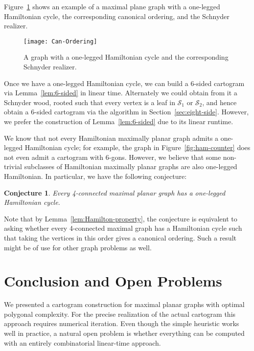 \documentclass[11pt]{article}
\newtheorem{conjecture}{Conjecture}[section]
\begin{document}
Figure~\ref{fig:Can-Ordering} shows an example of a maximal plane
graph with a one-legged Hamiltonian cycle, the corresponding canonical
ordering, and the Schnyder realizer.

\begin{figure}[htbp]
\centering
 \texttt{[image: Can-Ordering]}
 \caption{\small\sf A
  graph with a one-legged Hamiltonian cycle and
 the corresponding Schnyder realizer.}
 \label{fig:Can-Ordering}
\end{figure}


Once we have a one-legged Hamiltonian cycle, we can build a
6-sided cartogram via Lemma~\ref{lem:6-sided} in linear
time. Alternately we could obtain from it a Schnyder wood, rooted such
that every vertex is a leaf in $\mathcal{S}_1$ or $\mathcal{S}_2$, and
hence obtain a 6-sided cartogram via the algorithm in
Section~\ref{sec:eight-side}. However, we prefer the construction of Lemma~\ref{lem:6-sided} due to
its linear runtime.

We know that not every Hamiltonian maximally planar graph admits a
one-legged Hamiltonian cycle; for example, the graph in
Figure~\ref{fig:ham-counter} does not even admit a cartogram with
6-gons. However, we believe that some non-trivial subclasses of
Hamiltonian maximally planar graphs are also one-legged Hamiltonian. In particular, we have the following conjecture:

\begin{conjecture}
Every 4-connected maximal planar graph has a one-legged Hamiltonian cycle.
\end{conjecture}

Note that by Lemma~\ref{lem:Hamilton-property}, the conjecture is
equivalent to asking whether every 4-connected maximal graph has
a Hamiltonian cycle such that taking the vertices in this order gives
a canonical ordering.  Such a result might be of use for other graph
problems as well.














\section{Conclusion and Open Problems}
\label{sec:conc}

We presented a cartogram construction for maximal planar graphs with optimal polygonal complexity. For the precise realization of the actual cartogram this approach requires numerical iteration. Even though the simple heuristic works well in practice, a natural open problem is whether everything can be computed with an entirely combinatorial linear-time approach.
\end{document}
